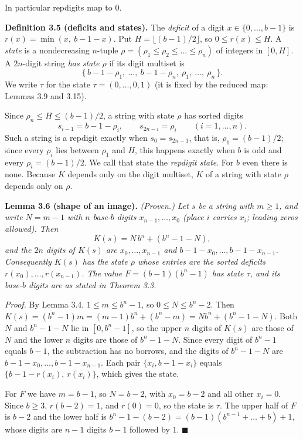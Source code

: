 \documentclass[11pt,letterpaper]{article}
\theoremstyle{paperstyle}
\theoremstyle{paperstyledef}
\theoremstyle{paperstylerem}
\begin{document}
In particular repdigits map to \(0\).

\textbf{Definition 3.5 (deficits and states).} The \emph{deficit} of a digit \(x \in \{0, \dots, b-1\}\) is \(r(x) = \min(x,\ b-1-x)\). Put \(H = \lfloor (b-1)/2 \rfloor\), so \(0 \leq r(x) \leq H\). A \emph{state} is a nondecreasing \(n\)-tuple \(\rho = (\rho_1 \leq \rho_2 \leq \dots \leq \rho_n)\) of integers in \([0, H]\). A \(2n\)-digit string \emph{has state \(\rho\)} if its digit multiset is \[\{\, b-1-\rho_1,\ \dots,\ b-1-\rho_n,\ \rho_1,\ \dots,\ \rho_n \,\}.\] We write \(\tau\) for the state \(\tau = (0, \dots, 0, 1)\) (it is fixed by the reduced map: Lemmas 3.9 and 3.15).

Since \(\rho_n \leq H \leq (b-1)/2\), a string with state \(\rho\) has sorted digits \[s_{i-1} = b-1-\rho_i, \qquad s_{2n-i} = \rho_i \qquad (i = 1, \dots, n). \tag{3.1}\] Such a string is a repdigit exactly when \(s_0 = s_{2n-1}\), that is, \(\rho_1 = (b-1)/2\); since every \(\rho_i\) lies between \(\rho_1\) and \(H\), this happens exactly when \(b\) is odd and every \(\rho_i = (b-1)/2\). We call that state the \emph{repdigit state}. For \(b\) even there is none. Because \(K\) depends only on the digit multiset, \(K\) of a string with state \(\rho\) depends only on \(\rho\).

\textbf{Lemma 3.6 (shape of an image).} \emph{(Proven.) Let \(s\) be a string with \(m \geq 1\), and write \(N = m - 1\) with \(n\) base-\(b\) digits \(x_{n-1}, \dots, x_0\) (place \(i\) carries \(x_i\); leading zeros allowed). Then} \[K(s) = N\, b^n + (b^n - 1 - N),\] \emph{and the \(2n\) digits of \(K(s)\) are \(x_0, \dots, x_{n-1}\) and \(b-1-x_0, \dots, b-1-x_{n-1}\). Consequently \(K(s)\) has the state \(\rho\) whose entries are the sorted deficits \(r(x_0), \dots, r(x_{n-1})\). The value \(F = (b-1)(b^n-1)\) has state \(\tau\), and its base-\(b\) digits are as stated in Theorem 3.3.}

\emph{Proof.} By Lemma 3.4, \(1 \leq m \leq b^n - 1\), so \(0 \leq N \leq b^n - 2\). Then \(K(s) = (b^n - 1)m = (m-1) b^n + (b^n - m) = N b^n + (b^n - 1 - N)\). Both \(N\) and \(b^n - 1 - N\) lie in \([0, b^n - 1]\), so the upper \(n\) digits of \(K(s)\) are those of \(N\) and the lower \(n\) digits are those of \(b^n - 1 - N\). Since every digit of \(b^n - 1\) equals \(b-1\), the subtraction has no borrows, and the digits of \(b^n - 1 - N\) are \(b-1-x_0, \dots, b-1-x_{n-1}\). Each pair \(\{x_i, b-1-x_i\}\) equals \(\{b-1-r(x_i),\ r(x_i)\}\), which gives the state.

For \(F\) we have \(m = b-1\), so \(N = b-2\), with \(x_0 = b-2\) and all other \(x_i = 0\). Since \(b \geq 3\), \(r(b-2) = 1\), and \(r(0) = 0\), so the state is \(\tau\). The upper half of \(F\) is \(b - 2\) and the lower half is \(b^n - 1 - (b-2) = (b-1)(b^{n-1} + \dots + b) + 1\), whose digits are \(n-1\) digits \(b-1\) followed by \(1\). \(\blacksquare\)
\end{document}

